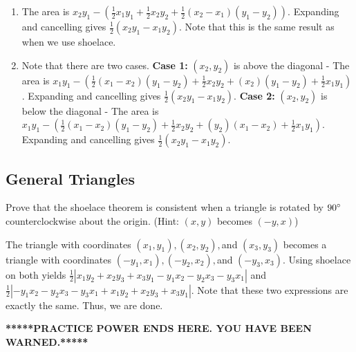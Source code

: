 \documentclass[11pt]{article}
\begin{document}
\begin{solution}
\begin{enumerate}[label=(\alph*)]
\phantom{hello what's up}
\item The area is $x_2y_1 - (\frac{1}{2}x_1y_1+\frac{1}{2}x_2y_2+\frac{1}{2}(x_2-x_1)(y_1-y_2))$.
Expanding and cancelling gives $\frac{1}{2}(x_2y_1-x_1y_2)$. Note that this is the same result as when we use shoelace.

\item Note that there are two cases. 
\newline \textbf{Case 1:} $(x_2, y_2)$ is above the diagonal - 
The area is $x_1y_1 - (\frac{1}{2}(x_1-x_2)(y_1-y_2)+\frac{1}{2}x_2y_2+(x_2)(y_1-y_2)+\frac{1}{2}x_1y_1)$.
Expanding and cancelling gives $\frac{1}{2}(x_2y_1-x_1y_2)$. 
\newline \textbf{Case 2:} $(x_2, y_2)$ is below the diagonal - 
The area is $x_1y_1 - (\frac{1}{2}(x_1-x_2)(y_1-y_2)+\frac{1}{2}x_2y_2+(y_2)(x_1-x_2)+\frac{1}{2}x_1y_1)$.
Expanding and cancelling gives $\frac{1}{2}(x_2y_1-x_1y_2)$. 

\end{enumerate} \end{solution}

\subsection{General Triangles}

\begin{problem}  Prove that the shoelace theorem is consistent when a triangle is rotated by $90\degree$ counterclockwise about the origin. (Hint: $(x, y)$ becomes $(-y, x)$)
\end{problem}

\begin{solution}
The triangle with coordinates $(x_1, y_1), (x_2, y_2),$and $(x_3, y_3)$ becomes a triangle with coordinates $(-y_1, x_1), (-y_2, x_2),$and $(-y_3, x_3)$. Using shoelace on both yields $\frac{1}{2}|x_1y_2+x_2y_3+x_3y_1-y_1x_2-y_2x_3-y_3x_1|$ and $\frac{1}{2}|-y_1x_2-y_2x_3-y_3x_1+x_1y_2+x_2y_3+x_3y_1|$. Note that these two expressions are exactly the same. Thus, we are done.
\end{solution}

\begin{center}\textbf{*****PRACTICE POWER ENDS HERE. YOU HAVE BEEN WARNED.*****}\end{center}
\end{document}

